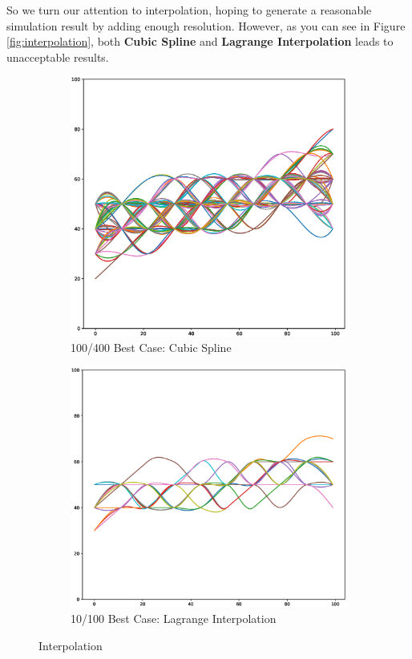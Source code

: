 \documentclass[12pt]{article}
\begin{document}
\par
So we turn our attention to interpolation, hoping to generate a reasonable simulation result by adding enough resolution. However, as you can see in Figure \ref{fig:interpolation}, both \textbf{Cubic Spline} and \textbf{Lagrange Interpolation} leads to unacceptable results.
\begin{figure}[H]
    \centering
    \label{fig:interpolation}
    \begin{subfigure}[b]{0.4\linewidth}
        \includegraphics[width=\linewidth]{cubic_spline.eps}
        \caption{100/400 Best Case: Cubic Spline}
    \end{subfigure}
    \begin{subfigure}[b]{0.4\linewidth}
        \label{fig:lagrange}
        \includegraphics[width=\linewidth]{lagrange.eps}
        \caption{10/100 Best Case: Lagrange Interpolation}
    \end{subfigure}
    \caption{Interpolation}
\end{figure}
\end{document}
